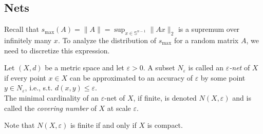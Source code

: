 \subsection{Nets}
Recall that $s_{\max}(A) = \|A\| = \sup_{x\in\mathbb{S}^{n-1}} \|Ax\|_2$ is a supremum over infinitely many $x$. To analyze the distribution of $s_{\max}$ for a random matrix $A$, we need to discretize this expression.
\begin{definition}
\begin{mdframed}
Let $(X,d)$ be a metric space and let $\varepsilon>0$. A subset $N_\varepsilon$ is called an \emph{$\varepsilon$-net} of $X$ if every point $x\in X$ can be approximated to an accuracy of $\varepsilon$ by some point $y\in N_\varepsilon$, i.e., s.t. $d(x,y)\leq \varepsilon$. \\
The minimal cardinality of an $\varepsilon$-net of $X$, if finite, is denoted $N(X,\varepsilon)$ and is called the \emph{covering number} of $X$ at scale $\varepsilon$.
\end{mdframed}
\end{definition}
Note that $N(X,\varepsilon)$ is finite if and only if $X$ is compact.
